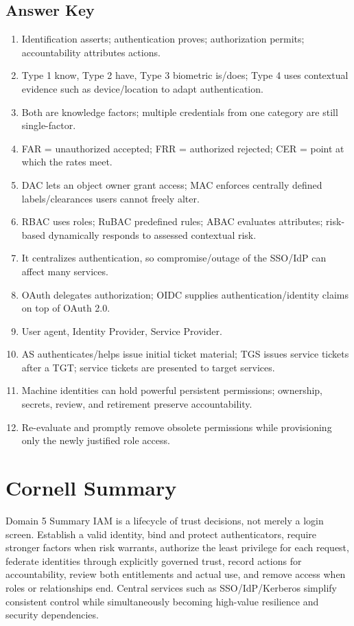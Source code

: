\documentclass[10pt,letterpaper]{article}
\begin{document}
\subsection*{\color{teal}Answer Key}
\begin{enumerate}
\item Identification asserts; authentication proves; authorization permits; accountability attributes actions.
\item Type 1 know, Type 2 have, Type 3 biometric is/does; Type 4 uses contextual evidence such as device/location to adapt authentication.
\item Both are knowledge factors; multiple credentials from one category are still single-factor.
\item FAR = unauthorized accepted; FRR = authorized rejected; CER = point at which the rates meet.
\item DAC lets an object owner grant access; MAC enforces centrally defined labels/clearances users cannot freely alter.
\item RBAC uses roles; RuBAC predefined rules; ABAC evaluates attributes; risk-based dynamically responds to assessed contextual risk.
\item It centralizes authentication, so compromise/outage of the SSO/IdP can affect many services.
\item OAuth delegates authorization; OIDC supplies authentication/identity claims on top of OAuth 2.0.
\item User agent, Identity Provider, Service Provider.
\item AS authenticates/helps issue initial ticket material; TGS issues service tickets after a TGT; service tickets are presented to target services.
\item Machine identities can hold powerful persistent permissions; ownership, secrets, review, and retirement preserve accountability.
\item Re-evaluate and promptly remove obsolete permissions while provisioning only the newly justified role access.
\end{enumerate}

\section{\color{navy}Cornell Summary}
\begin{summarybox}{Domain 5 Summary}
IAM is a lifecycle of trust decisions, not merely a login screen. Establish a valid identity, bind and protect authenticators, require stronger factors when risk warrants, authorize the least privilege for each request, federate identities through explicitly governed trust, record actions for accountability, review both entitlements and actual use, and remove access when roles or relationships end. Central services such as SSO/IdP/Kerberos simplify consistent control while simultaneously becoming high-value resilience and security dependencies.
\end{summarybox}
\end{document}
